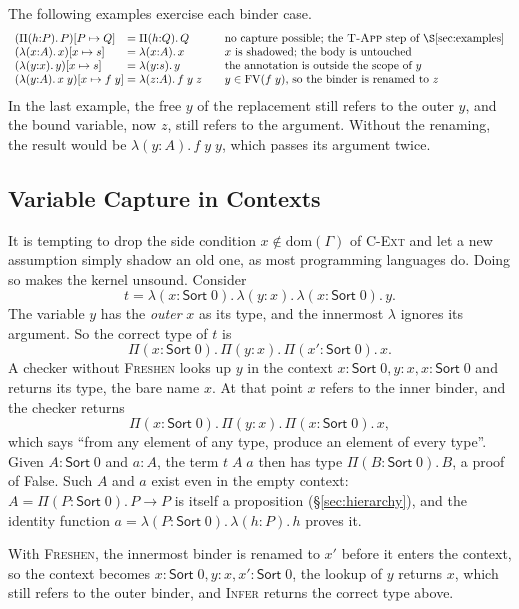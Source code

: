 \documentclass[acmsmall,screen,nonacm]{acmart}
\newcommand{\Sort}[1]{\mathsf{Sort}\;#1}
\newcommand{\tPi}[3]{\Pi(#1{:}#2).\,#3}
\newcommand{\tLam}[3]{\lambda(#1{:}#2).\,#3}
\newcommand{\subst}[3]{#1[#2 \mapsto #3]}
\newcommand{\FV}{\mathrm{FV}}
\newcommand{\dom}{\mathrm{dom}}
\begin{document}
\noindent The following examples exercise each binder case.
\[
\begin{array}{l@{\;=\;}l@{\qquad}l}
\subst{(\tPi{h}{P}{P})}{P}{Q} & \tPi{h}{Q}{Q} & \text{no capture possible; the \textsc{T-App} step of \S\ref{sec:examples}} \\
\subst{(\tLam{x}{A}{x})}{x}{s} & \tLam{x}{A}{x} & \text{$x$ is shadowed; the body is untouched} \\
\subst{(\tLam{y}{x}{y})}{x}{s} & \tLam{y}{s}{y} & \text{the annotation is outside the scope of $y$} \\
\subst{(\tLam{y}{A}{x\;y})}{x}{f\;y} & \tLam{z}{A}{f\;y\;z} & \text{$y \in \FV(f\;y)$, so the binder is renamed to $z$}
\end{array}
\]
In the last example, the free $y$ of the replacement still refers to the outer $y$, and the bound variable, now $z$, still refers to the argument.
Without the renaming, the result would be $\tLam{y}{A}{f\;y\;y}$, which passes its argument twice.

\subsection{Variable Capture in Contexts}
\label{sec:capture}

It is tempting to drop the side condition $x \notin \dom(\Gamma)$ of \textsc{C-Ext} and let a new assumption simply shadow an old one, as most programming languages do.
Doing so makes the kernel unsound.
Consider
\[
t = \tLam{x}{\Sort{0}}{\tLam{y}{x}{\tLam{x}{\Sort{0}}{y}}}.
\]
The variable $y$ has the \emph{outer} $x$ as its type, and the innermost $\lambda$ ignores its argument.
So the correct type of $t$ is
\[
\tPi{x}{\Sort{0}}{\tPi{y}{x}{\tPi{x'}{\Sort{0}}{x}}}.
\]
A checker without \textsc{Freshen} looks up $y$ in the context $x : \Sort{0}, y : x, x : \Sort{0}$ and returns its type, the bare name $x$.
At that point $x$ refers to the inner binder, and the checker returns
\[
\tPi{x}{\Sort{0}}{\tPi{y}{x}{\tPi{x}{\Sort{0}}{x}}},
\]
which says ``from any element of any type, produce an element of every type''.
Given $A : \Sort{0}$ and $a : A$, the term $t\;A\;a$ then has type $\tPi{B}{\Sort{0}}{B}$, a proof of False.
Such $A$ and $a$ exist even in the empty context: $A = \tPi{P}{\Sort{0}}{P \to P}$ is itself a proposition (\S\ref{sec:hierarchy}), and the identity function $a = \tLam{P}{\Sort{0}}{\tLam{h}{P}{h}}$ proves it.

With \textsc{Freshen}, the innermost binder is renamed to $x'$ before it enters the context,
so the context becomes $x : \Sort{0}, y : x, x' : \Sort{0}$, the lookup of $y$ returns $x$, which still refers to the outer binder,
and \textsc{Infer} returns the correct type above.
\end{document}
